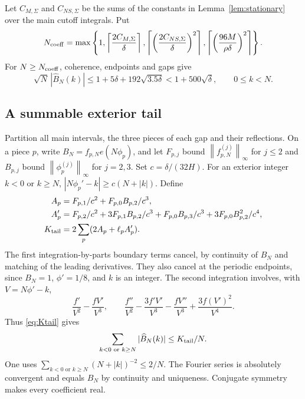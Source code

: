 \documentclass[11pt]{article}
\theoremstyle{remark}
\newcommand{\ceil}[1]{\left\lceil #1\right\rceil}
\newcommand{\norm}[1]{\left\|#1\right\|}
\begin{document}
Let $C_{M,\Sigma}$ and $C_{NS,\Sigma}$ be the sums of the constants in
Lemma~\ref{lem:stationary} over the main cutoff integrals. Put
\begin{equation}\label{eq:Ncoeff}
 N_{\rm coeff}=\max\left\{1,
 \ceil{\frac{2C_{M,\Sigma}}\delta},
 \ceil{\left(\frac{2C_{NS,\Sigma}}\delta\right)^2},
 \ceil{\left(\frac{96M}{\rho\delta}\right)^2}\right\}.
\end{equation}
For $N\ge N_{\rm coeff}$, coherence, endpoints and gaps give
\begin{equation}\label{eq:interior-coeff}
 \sqrt N\,|\widehat B_N(k)|
 \le1+5\delta+192\sqrt{3.5\delta}<1+500\sqrt\delta,
 \qquad 0\le k<N.
\end{equation}

\subsection{A summable exterior tail}

Partition all main intervals, the three pieces of each gap and their
reflections. On a piece $p$, write $B_N=f_{p,N}e(N\phi_p)$, and let
$F_{p,j}$ bound $\norm{f_{p,N}^{(j)}}_\infty$ for $j\le2$ and
$B_{p,j}$ bound $\norm{\phi_p^{(j)}}_\infty$ for $j=2,3$.
Set $c=\delta/(32H)$. For an exterior integer $k<0$ or $k\ge N$,
$|N\phi_p'-k|\ge c(N+|k|)$. Define
\begin{align}
 A_p&=F_{p,1}/c^2+F_{p,0}B_{p,2}/c^3,\notag\\
 A_p'&=F_{p,2}/c^2+3F_{p,1}B_{p,2}/c^3
          +F_{p,0}B_{p,3}/c^3+3F_{p,0}B_{p,2}^2/c^4,\notag\\
 K_{\rm tail}&=2\sum_p(2A_p+\ell_pA_p').              \label{eq:Ktail}
\end{align}
The first integration-by-parts boundary terms cancel, by continuity of
$B_N$ and matching of the leading derivatives. They also cancel at the
periodic endpoints, since $B_N=1$, $\phi'=1/8$, and $k$ is an integer.
The second integration involves, with $V=N\phi'-k$,
\[
 \frac{f'}{V^2}-\frac{fV'}{V^3},\qquad
 \frac{f''}{V^2}-\frac{3f'V'}{V^3}-\frac{fV''}{V^3}
                        +\frac{3f(V')^2}{V^4}.
\]
Thus \eqref{eq:Ktail} gives
\begin{equation}\label{eq:tail}
 \sum_{k<0\text{ or }k\ge N}|\widehat B_N(k)|\le K_{\rm tail}/N.
\end{equation}
One uses $\sum_{k<0\text{ or }k\ge N}(N+|k|)^{-2}\le2/N$.
The Fourier series is absolutely convergent and equals $B_N$ by
continuity and uniqueness. Conjugate symmetry makes every coefficient real.
\end{document}
